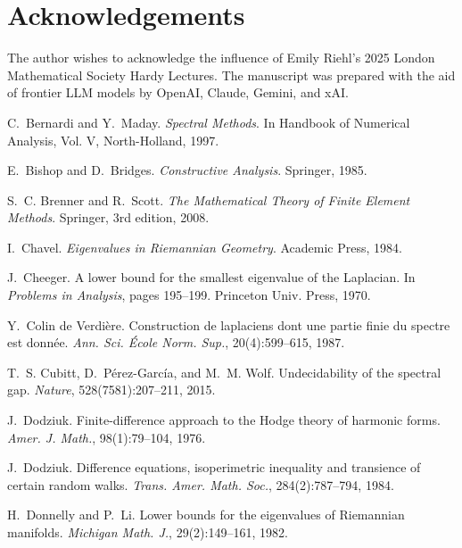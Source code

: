 \documentclass[11pt]{article}
\theoremstyle{definition}\newtheorem{definition}[theorem]{Definition}
\theoremstyle{remark}\newtheorem{remark}[theorem]{Remark}
\begin{document}
\section*{Acknowledgements}
The author wishes to acknowledge the influence of Emily Riehl's 2025 London Mathematical Society Hardy Lectures. The manuscript was prepared with the aid of frontier LLM models by OpenAI, Claude, Gemini, and xAI.
\begin{thebibliography}{99}

C.~Bernardi and Y.~Maday.
\newblock \emph{Spectral Methods}.
\newblock In Handbook of Numerical Analysis, Vol. V, North-Holland, 1997.

E.~Bishop and D.~Bridges.
\newblock \emph{Constructive Analysis}.
\newblock Springer, 1985.

S.~C. Brenner and R.~Scott.
\newblock \emph{The Mathematical Theory of Finite Element Methods}.
\newblock Springer, 3rd edition, 2008.

I.~Chavel.
\newblock \emph{Eigenvalues in Riemannian Geometry}.
\newblock Academic Press, 1984.

J.~Cheeger.
\newblock A lower bound for the smallest eigenvalue of the {L}aplacian.
\newblock In \emph{Problems in Analysis}, pages 195--199. Princeton Univ. Press, 1970.

Y.~Colin de Verdière.
\newblock Construction de laplaciens dont une partie finie du spectre est donnée.
\newblock \emph{Ann. Sci. École Norm. Sup.}, 20(4):599--615, 1987.

T.~S. Cubitt, D.~Pérez-García, and M.~M. Wolf.
\newblock Undecidability of the spectral gap.
\newblock \emph{Nature}, 528(7581):207--211, 2015.

J.~Dodziuk.
\newblock Finite-difference approach to the Hodge theory of harmonic forms.
\newblock \emph{Amer. J. Math.}, 98(1):79--104, 1976.

J.~Dodziuk.
\newblock Difference equations, isoperimetric inequality and transience of certain random walks.
\newblock \emph{Trans. Amer. Math. Soc.}, 284(2):787--794, 1984.

H.~Donnelly and P.~Li.
\newblock Lower bounds for the eigenvalues of {R}iemannian manifolds.
\newblock \emph{Michigan Math. J.}, 29(2):149--161, 1982.


\end{thebibliography}
\end{document}
